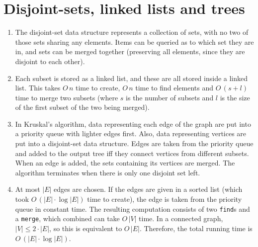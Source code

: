 \documentclass[11pt]{article}
\begin{document}
\section{Disjoint-sets, linked lists and trees}
\begin{enumerate}
\item The disjoint-set data structure represents a collection of sets, with no two of those sets sharing any elements. Items can be queried as to which set they are in, and sets can be merged together (preserving all elements, since they are disjoint to each other).
\item Each subset is stored as a linked list, and these are all stored inside a linked list. This takes \(O\,n\) time to create, \(O\,n\) time to find elements and \(O\,(s+l)\) time to merge two subsets (where \(s\) is the number of subsets and \(l\) is the size of the first subset of the two being merged).
\item In Kruskal's algorithm, data representing each edge of the graph are put into a priority queue with lighter edges first. Also, data representing vertices are put into a disjoint-set data structure. Edges are taken from the priority queue and added to the output tree iff they connect vertices from different subsets. When an edge is added, the sets containing its vertices are merged. The algorithm terminates when there is only one disjoint set left.
\item At most \(|E|\) edges are chosen. If the edges are given in a sorted list (which took \(O\,(|E|\cdot\log{|E|})\) time to create), the edge is taken from the priority queue in constant time. The resulting computation consists of two \texttt{find}s and a \texttt{merge}, which combined can take \(O\,|V|\) time. In a connected graph, \(|V|\leq 2\cdot|E|\), so this is equivalent to \(O\,|E|\). Therefore, the total running time is \(O\,(|E|\cdot\log{|E|})\).
\end{enumerate}
\end{document}
